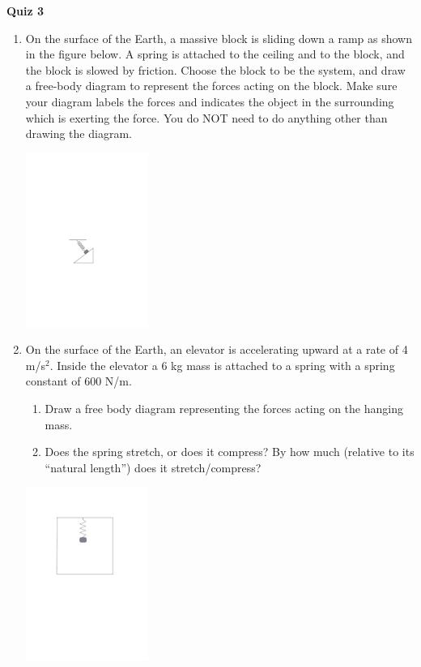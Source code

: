 \documentclass{article}
\begin{document}
\fancyfoot[C]{\thepage}
\vspace*{0cm}
\begin{center}
	{\LARGE \textbf{Quiz 3}}
\end{center}
\begin{enumerate}
	\item On the surface of the Earth, a massive block is sliding down a ramp as shown in the figure below. A spring is attached to the ceiling and to the block, and the block is slowed by friction. Choose the block to be the system, and draw a free-body diagram to represent the forces acting on the block. Make sure your diagram labels the forces and indicates the object in the surrounding which is exerting the force. You do NOT need to do anything other than drawing the diagram.
\begin{center}
	\includegraphics[width=4cm]{fbd.pdf}
\end{center}
	\vspace{3cm}
	\item On the surface of the Earth, an elevator is accelerating upward at a rate of 4 m/s$^2$. Inside the elevator a 6 kg mass is attached to a spring with a spring constant of 600 N/m.
	\begin{enumerate}
		\item Draw a free body diagram representing the forces acting on the hanging mass.
		\item Does the spring stretch, or does it compress? By how much (relative to its ``natural length'') does it stretch/compress?
	\end{enumerate} 
\begin{center}
	\includegraphics[width=4cm]{elevator.pdf}
\end{center}
\end{enumerate}
\end{document}
